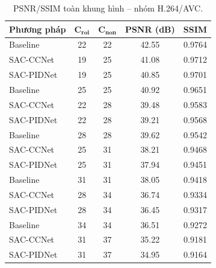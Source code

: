 \begin{table}[H]
\centering
\caption[PSNR/SSIM -- H.264/AVC]{PSNR/SSIM toàn khung hình -- nhóm H.264/AVC.}
\label{tab:psnr-ssim-x264}
\small
\begin{tabular}{p{}cccc}
\toprule
\textbf{Phương pháp} & $\boldsymbol{C_{roi}}$ & $\boldsymbol{C_{non}}$ & \textbf{PSNR (dB)} & \textbf{SSIM} \\
\midrule
Baseline & 22 & 22 & 42.55 & 0.9764 \\
SAC-CCNet & 19 & 25 & 41.08 & 0.9712 \\
SAC-PIDNet & 19 & 25 & 40.85 & 0.9701 \\
\midrule
Baseline & 25 & 25 & 40.92 & 0.9651 \\
SAC-CCNet & 22 & 28 & 39.48 & 0.9583 \\
SAC-PIDNet & 22 & 28 & 39.21 & 0.9568 \\
\midrule
Baseline & 28 & 28 & 39.62 & 0.9542 \\
SAC-CCNet & 25 & 31 & 38.21 & 0.9468 \\
SAC-PIDNet & 25 & 31 & 37.94 & 0.9451 \\
\midrule
Baseline & 31 & 31 & 38.05 & 0.9418 \\
SAC-CCNet & 28 & 34 & 36.74 & 0.9334 \\
SAC-PIDNet & 28 & 34 & 36.45 & 0.9317 \\
\midrule
Baseline & 34 & 34 & 36.51 & 0.9272 \\
SAC-CCNet & 31 & 37 & 35.22 & 0.9181 \\
SAC-PIDNet & 31 & 37 & 34.95 & 0.9164 \\
\bottomrule
\end{tabular}
\end{table}

